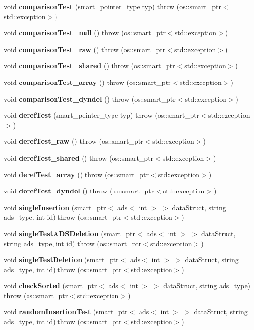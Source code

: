 \begin{DoxyCompactItemize}
\item 
void {\bf comparison\+Test} (smart\+\_\+pointer\+\_\+type typ)  throw (os\+::smart\+\_\+ptr$<$std\+::exception$>$)
\item 
void {\bf comparison\+Test\+\_\+null} ()  throw (os\+::smart\+\_\+ptr$<$std\+::exception$>$)
\item 
void {\bf comparison\+Test\+\_\+raw} ()  throw (os\+::smart\+\_\+ptr$<$std\+::exception$>$)
\item 
void {\bf comparison\+Test\+\_\+shared} ()  throw (os\+::smart\+\_\+ptr$<$std\+::exception$>$)
\item 
void {\bf comparison\+Test\+\_\+array} ()  throw (os\+::smart\+\_\+ptr$<$std\+::exception$>$)
\item 
void {\bf comparison\+Test\+\_\+dyndel} ()  throw (os\+::smart\+\_\+ptr$<$std\+::exception$>$)
\item 
void {\bf deref\+Test} (smart\+\_\+pointer\+\_\+type typ)  throw (os\+::smart\+\_\+ptr$<$std\+::exception$>$)
\item 
void {\bf deref\+Test\+\_\+raw} ()  throw (os\+::smart\+\_\+ptr$<$std\+::exception$>$)
\item 
void {\bf deref\+Test\+\_\+shared} ()  throw (os\+::smart\+\_\+ptr$<$std\+::exception$>$)
\item 
void {\bf deref\+Test\+\_\+array} ()  throw (os\+::smart\+\_\+ptr$<$std\+::exception$>$)
\item 
void {\bf deref\+Test\+\_\+dyndel} ()  throw (os\+::smart\+\_\+ptr$<$std\+::exception$>$)
\item 
void {\bf single\+Insertion} (smart\+\_\+ptr$<$ ads$<$ int $>$ $>$ data\+Struct, string ads\+\_\+type, int id)  throw (os\+::smart\+\_\+ptr$<$std\+::exception$>$)
\item 
void {\bf single\+Test\+A\+D\+S\+Deletion} (smart\+\_\+ptr$<$ ads$<$ int $>$ $>$ data\+Struct, string ads\+\_\+type, int id)  throw (os\+::smart\+\_\+ptr$<$std\+::exception$>$)
\item 
void {\bf single\+Test\+Deletion} (smart\+\_\+ptr$<$ ads$<$ int $>$ $>$ data\+Struct, string ads\+\_\+type, int id)  throw (os\+::smart\+\_\+ptr$<$std\+::exception$>$)
\item 
void {\bf check\+Sorted} (smart\+\_\+ptr$<$ ads$<$ int $>$ $>$ data\+Struct, string ads\+\_\+type)  throw (os\+::smart\+\_\+ptr$<$std\+::exception$>$)
\item 
void {\bf random\+Insertion\+Test} (smart\+\_\+ptr$<$ ads$<$ int $>$ $>$ data\+Struct, string ads\+\_\+type, int id)  throw (os\+::smart\+\_\+ptr$<$std\+::exception$>$)

\end{DoxyCompactItemize}

